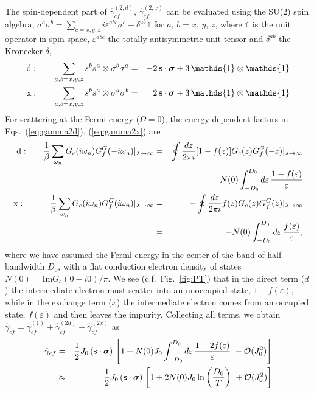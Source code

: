 \documentclass[12pt,twoside]{article}
\newcommand{\im}{\text{Im}}
\newcommand{\bsig}{\boldsymbol\sigma}
\newcommand{\Eqs}[2]{Eqs.~(\ref{#1}), (\ref{#2})}
\begin{document}
The spin-dependent part of $\hat\gamma_{cf}^{(2,d)}$, $\hat\gamma_{cf}^{(2,x)}$ can 
be evaluated using the SU(2) spin algebra, $ \sigma^{a}\sigma^{b} = \sum_{c=x,y,z}
i \varepsilon^{abc} \sigma^{c} +\delta^{ab}\mathds{1}$ for $a,\,b=x,\,y,\,z$,
where $\mathds{1}$ is the unit operator in spin space,   
$\varepsilon^{abc}$ the totally antisymmetric unit tensor and 
$\delta^{ab}$ the Kronecker-$\delta$,
\begin{eqnarray}
{\rm d:} \qquad \sum_{a,b=x,y,z} s^bs^a\otimes \sigma^b\sigma^a &=&
-2\,  {\bf s}\cdot \bsig +3\, \mathds{1}\otimes\mathds{1}
\label{eq:spinvertex_d}\\
{\rm x:} \qquad \sum_{a,b=x,y,z} s^bs^a\otimes \sigma^a\sigma^b &=&
\phantom{-}2\, {\bf s}\cdot\bsig +3\, \mathds{1}\otimes \mathds{1}
\label{eq:spinvertex_x}
\end{eqnarray}
For scattering at the Fermi energy ($\Omega =0$), 
the energy-dependent factors in \Eqs{eq:gamma2d}{eq:gamma2x} are 
\begin{eqnarray}
{\rm d:} \qquad \frac{1}{\beta} \sum_{\omega_n} 
G_{c}(i\omega_n)G_{f}^G(-i\omega_n)|_{\lambda\to\infty}
&=& \oint \frac{dz}{2\pi i} [1-f(z)] G_{c}(z)G_{f}^G(-z)|_{\lambda\to\infty}
\nonumber\\
&=&N(0)\int_{-D_0}^{D_0} d\varepsilon\, \frac{1-f(\varepsilon)}{\varepsilon}
\label{eq:E_direct}\\
{\rm x:} \qquad \ \ \ \, \frac{1}{\beta} \sum_{\omega_n}
G_{c}(i\omega_n)G_{f}^G(i\omega_n)|_{\lambda\to\infty}
&=& - \oint \frac{dz}{2\pi i} f(z) G_{c}(z)G_{f}^G(z)|_{\lambda\to\infty}
\nonumber \\
&=& - N(0)\int_{-D_0}^{D_0} d\varepsilon\, \frac{f(\varepsilon)}{\varepsilon},
\label{eq:E_exchange}
\end{eqnarray}
where we have assumed the Fermi energy in the center of the band of 
half bandwidth $D_0$, with a flat conduction electron density of states
$N(0)=\im G_c(0-i0)/\pi$.
We see (c.f.~Fig.~\ref{fig:PT}) that in the direct term ($d$) the 
intermediate electron must scatter into an unoccupied state, 
$1-f(\varepsilon)$, while in the exchange term ($x$) the intermediate 
electron comes from an occupied state, $f(\varepsilon)$ and then leaves 
the impurity. Collecting all terms, we obtain 
$\hat\gamma_{cf}=\hat\gamma_{cf}^{(1)}+\hat\gamma_{cf}^{(2d)}+\hat\gamma_{cf}^{(2x)}$ 
as  
\begin{eqnarray}
\hat\gamma_{cf} 
&=& \frac{1}{2}J_0 \left( {\bf s}\cdot\bsig \right)\,\left[ 1 + 
N(0)J_0\int_{-D_0}^{D_0} d\varepsilon\, 
\frac{1-2f(\varepsilon)}{\varepsilon}\ + {\cal O}(J_0^2) 
\right]   \nonumber\\
&\approx&\frac{1}{2}J_0 \left( {\bf s}\cdot\bsig \right)\,
\left[ 1 + 2N(0)J_0 \ln\left(\frac{D_0}{T} \right) 
\ +{\cal O}(J_0^2) \right] 
\label{eq:PT_log}
\end{eqnarray}
\end{document}
